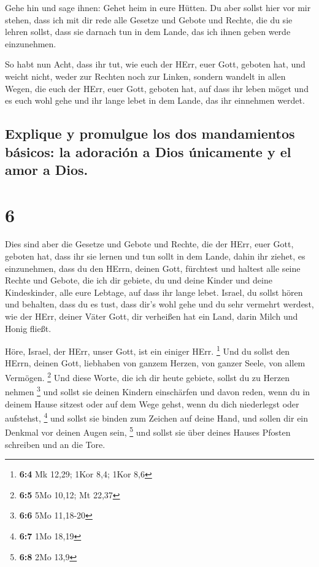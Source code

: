  Gehe hin und sage ihnen: Gehet heim in eure Hütten.
 Du aber sollst hier vor mir stehen, dass ich mit dir
rede alle Gesetze und Gebote und Rechte, die du sie lehren sollst, dass
sie darnach tun in dem Lande, das ich ihnen geben werde einzunehmen.

 So habt nun Acht, dass ihr tut, wie euch der HErr, euer
Gott, geboten hat, und weicht nicht, weder zur Rechten noch zur Linken,
 sondern wandelt in allen Wegen, die euch der HErr, euer
Gott, geboten hat, auf dass ihr leben möget und es euch wohl gehe und
ihr lange lebet in dem Lande, das ihr einnehmen werdet.

\hypertarget{explique-y-promulgue-los-dos-mandamientos-buxe1sicos-la-adoraciuxf3n-a-dios-uxfanicamente-y-el-amor-a-dios.}{%
\subsection{Explique y promulgue los dos mandamientos básicos: la
adoración a Dios únicamente y el amor a
Dios.}\label{explique-y-promulgue-los-dos-mandamientos-buxe1sicos-la-adoraciuxf3n-a-dios-uxfanicamente-y-el-amor-a-dios.}}

\hypertarget{section-5}{%
\section{6}\label{section-5}}

 Dies sind aber die Gesetze und Gebote und Rechte, die der
HErr, euer Gott, geboten hat, dass ihr sie lernen und tun sollt in dem
Lande, dahin ihr ziehet, es einzunehmen,  dass du den
HErrn, deinen Gott, fürchtest und haltest alle seine Rechte und Gebote,
die ich dir gebiete, du und deine Kinder und deine Kindeskinder, alle
eure Lebtage, auf dass ihr lange lebet.  Israel, du sollst
hören und behalten, dass du es tust, dass dir's wohl gehe und du sehr
vermehrt werdest, wie der HErr, deiner Väter Gott, dir verheißen hat ein
Land, darin Milch und Honig fließt.

 Höre, Israel, der HErr, unser Gott, ist ein einiger HErr.
\footnote{\textbf{6:4} Mk 12,29; 1Kor 8,4; 1Kor 8,6}  Und
du sollst den HErrn, deinen Gott, liebhaben von ganzem Herzen, von
ganzer Seele, von allem Vermögen. \footnote{\textbf{6:5} 5Mo 10,12; Mt
  22,37}  Und diese Worte, die ich dir heute gebiete,
sollst du zu Herzen nehmen \footnote{\textbf{6:6} 5Mo 11,18-20}
 und sollst sie deinen Kindern einschärfen und davon
reden, wenn du in deinem Hause sitzest oder auf dem Wege gehst, wenn du
dich niederlegst oder aufstehst, \footnote{\textbf{6:7} 1Mo 18,19}
 und sollst sie binden zum Zeichen auf deine Hand, und
sollen dir ein Denkmal vor deinen Augen sein, \footnote{\textbf{6:8} 2Mo
  13,9}  und sollst sie über deines Hauses Pfosten
schreiben und an die Tore.

